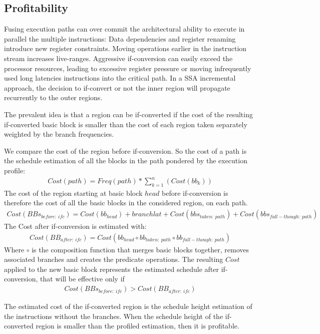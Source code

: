 \subsection{Profitability}

Fusing execution paths can over commit the architectural ability to execute in parallel the multiple instructions: Data dependencies and register renaming introduce new register constraints. Moving operations earlier in the instruction stream increases live-ranges. 
Aggressive if-conversion can easily exceed the processor resources, leading to excessive register pressure or moving infrequently used long latencies instructions into the critical path. In a SSA incremental approach, the decision to if-convert or not the inner region will propagate recurrently to the outer regions.

The prevalent idea is that a region can be if-converted if the cost of the resulting if-converted basic block is smaller than the cost of each region taken separately weighted by the branch frequencies.

We compare the cost of the region before if-conversion. So the cost of a path is the schedule estimation of all the blocks in the path pondered by the execution profile:
\begin{align*}
Cost(path)=Freq(path)*\sum_{k=1}^n(Cost(bb_{k}))
\end{align*}
The cost of the region starting at basic block $head$ before if-conversion is therefore the cost of all the basic blocks in the considered region, on each path.
\begin{align*}
Cost(BBs_{before:\ ifc})=Cost(bb_{head}) + branchlat + Cost(bbs_{taken:\ path}) + Cost(bbs_{fall-though:\ path})
\end{align*}
The Cost after if-conversion is estimated with:
\begin{align*}
Cost(BB_{after:\ ifc})=Cost(bb_{head} \circ bb_{taken:\ path} \circ bb_{fall-though:\ path})
\end{align*}
Where $\circ$ is the composition function that merges basic blocks together, removes associated branches and creates the predicate operations. The resulting $Cost$ applied to the new basic block represents the estimated schedule after if-conversion, that will be effective only if
\begin{align*}
Cost(BBs_{before:\ ifc}) > Cost(BB_{after:\ ifc})
\end{align*}

The estimated cost of the if-converted region is the schedule height estimation of the instructions without the branches. When the schedule height of the if-converted region is smaller than the profiled estimation, then it is profitable.

